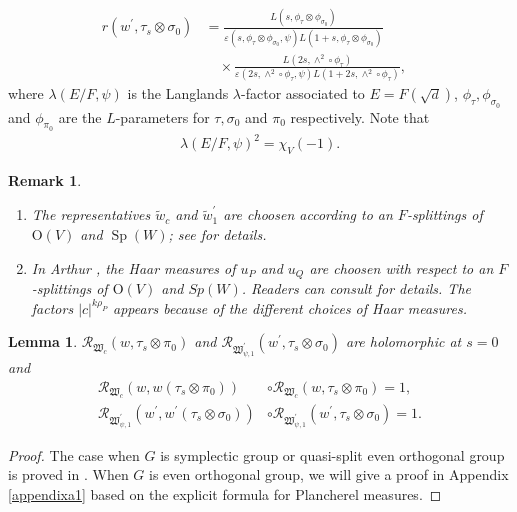 \documentclass[article]{article}
\numberwithin{equation}{section}
\newtheorem{lemma}[theorem]{Lemma}
\newtheorem{remark}[theorem]{Remark}
\theoremstyle{definition}
\DeclareMathOperator{\SP}{Sp}
\begin{document}
\begin{itemize}
\begin{equation}
\begin{aligned}
	r\left(w^\prime, \tau_{s} \otimes \sigma_0\right)
	&= \frac{L\left(s, \phi_{\tau} \otimes \phi_{\sigma_0}\right)}{\varepsilon\left(s, \phi_{\tau} \otimes \phi_{\sigma_0}, \psi\right) L\left(1+s, \phi_{\tau} \otimes \phi_{\sigma_0}\right)} \\
	& \quad \times \frac{L\left(2 s, \wedge^{2} \circ \phi_{\tau}\right)}{\varepsilon\left(2 s, \wedge^{2} \circ \phi_{\tau}, \psi\right) L\left(1+2 s, \wedge^{2} \circ \phi_{\tau}\right)},&
	\end{aligned}
	\end{equation}
	where $\lambda(E/F, \psi)$ is the Langlands $\lambda$-factor associated to $E=F(\sqrt{d})$, $\phi_{\tau}, \phi_{\sigma_0}$ and $\phi_{\pi_0}$ are the $L$-parameters for $\tau,\sigma_0$ and $\pi_0$ respectively. Note that 
	\begin{align}\label{12345}
	\lambda(E/F, \psi)^2=\chi_{V}(-1).
	\end{align}  
\end{itemize}
\begin{remark}
\begin{enumerate}
	\item The representatives $\widetilde{w}_c$ and $\widetilde{w}^\prime_1$ are choosen according to an $F$-splittings of $\mathrm O(V)$ and $\SP(W)$; see \cite[\S 6.2]{MR3788848} for details. 
	\item In Arthur \cite{MR3135650}, the Haar measures of $u_P$ and $u_Q$ are choosen with respect to an $F$-splittings of $\mathrm O(V)$ and $Sp(W)$. Readers can consult \cite[\S 6.3]{MR3788848} for details. The factors $|c|^{k\rho_{P}}$ appears because of the different choices of Haar measures. 
\end{enumerate}
\end{remark}
\begin{lemma}\label{homomorphicatsequal0}
	$ \mathcal{R}_{\mathfrak W_{c}}\left(w, \tau_{s} \otimes \pi_0\right) $ and  $\mathcal{R}_{\mathfrak W^\prime_{\psi,1}}\left(w^{\prime}, \tau_{s} \otimes \sigma_0 \right)$ are holomorphic at $s=0$ and 
	\begin{align*}
	\mathcal{R}_{\mathfrak W_{c}}\left(w, w(\tau_{s} \otimes \pi_0)\right)&\circ \mathcal{R}_{\mathfrak W_{c}}\left(w, \tau_{s} \otimes \pi_0\right)=1, \\
	\mathcal{R}_{\mathfrak W^\prime_{\psi,1}}\left(w^\prime, w^\prime(\tau_{s} \otimes \sigma_0)\right)&\circ \mathcal{R}_{\mathfrak W^\prime_{\psi,1}}\left(w^\prime, \tau_{s} \otimes \sigma_0\right)=1.
	\end{align*}
\end{lemma}
\begin{proof}
	The case when $G$ is symplectic group or quasi-split even orthogonal group is proved in \cite[Proposition 2.3.1]{MR3135650}. When $G$ is even orthogonal group, we will give a proof in Appendix \ref{appendixa1} based on the explicit formula for Plancherel measures. 
\end{proof}
\end{document}
